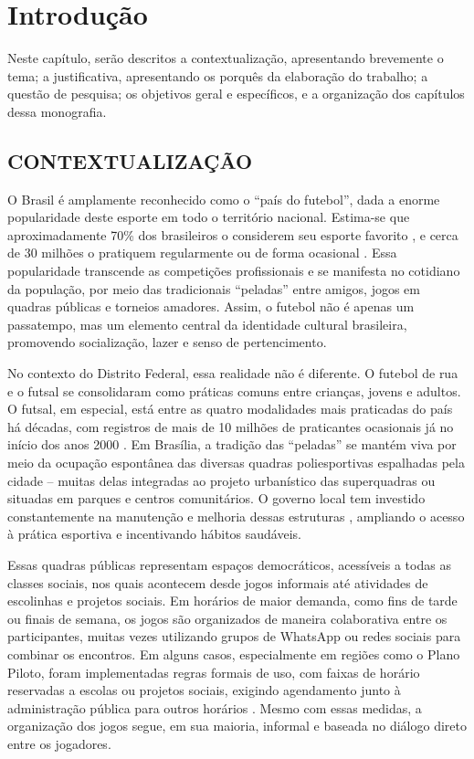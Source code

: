 \chapter[Introdução]{Introdução}

Neste capítulo, serão descritos a contextualização, apresentando brevemente o
tema; a justificativa, apresentando os porquês da elaboração do trabalho; a questão de
pesquisa; os objetivos geral e específicos, e a organização dos capítulos dessa monografia.

\section{CONTEXTUALIZAÇÃO}

O Brasil é amplamente reconhecido como o “país do futebol”, dada a enorme popularidade deste esporte em todo o território nacional. Estima-se que aproximadamente 70\% dos brasileiros o considerem seu esporte favorito \cite{gente2023}, e cerca de 30 milhões o pratiquem regularmente ou de forma ocasional \cite{sportbay2022}. Essa popularidade transcende as competições profissionais e se manifesta no cotidiano da população, por meio das tradicionais “peladas” entre amigos, jogos em quadras públicas e torneios amadores. Assim, o futebol não é apenas um passatempo, mas um elemento central da identidade cultural brasileira, promovendo socialização, lazer e senso de pertencimento.

No contexto do Distrito Federal, essa realidade não é diferente. O futebol de rua e o futsal se consolidaram como práticas comuns entre crianças, jovens e adultos. O futsal, em especial, está entre as quatro modalidades mais praticadas do país há décadas, com registros de mais de 10 milhões de praticantes ocasionais já no início dos anos 2000 \cite{foothub2022}. Em Brasília, a tradição das “peladas” se mantém viva por meio da ocupação espontânea das diversas quadras poliesportivas espalhadas pela cidade – muitas delas integradas ao projeto urbanístico das superquadras ou situadas em parques e centros comunitários. O governo local tem investido constantemente na manutenção e melhoria dessas estruturas \cite{segov2023}, ampliando o acesso à prática esportiva e incentivando hábitos saudáveis.

Essas quadras públicas representam espaços democráticos, acessíveis a todas as classes sociais, nos quais acontecem desde jogos informais até atividades de escolinhas e projetos sociais. Em horários de maior demanda, como fins de tarde ou finais de semana, os jogos são organizados de maneira colaborativa entre os participantes, muitas vezes utilizando grupos de WhatsApp ou redes sociais para combinar os encontros. Em alguns casos, especialmente em regiões como o Plano Piloto, foram implementadas regras formais de uso, com faixas de horário reservadas a escolas ou projetos sociais, exigindo agendamento junto à administração pública para outros horários \cite{peixoto2025}. Mesmo com essas medidas, a organização dos jogos segue, em sua maioria, informal e baseada no diálogo direto entre os jogadores.

